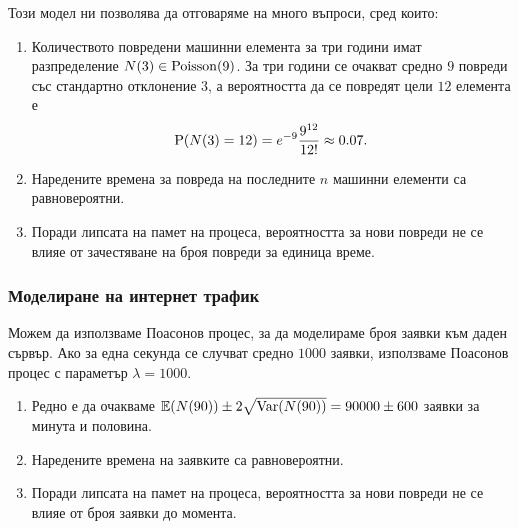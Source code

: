 \documentclass[numbers=endperiod, DIV=15, bibliography=totocnumbered]{scrartcl}
\begin{document}
Този модел ни позволява да отговаряме на много въпроси, сред които:
\begin{enumerate}
  \item Количеството повредени машинни елемента за три години имат разпределение $N(3) \in \operatorname{Poisson}(9)$. За три години се очакват средно $9$ повреди със стандартно отклонение $3$, а вероятността да се повредят цели $12$ елемента е
  \begin{displaymath}
    \operatorname{P}(N(3) = 12) = e^{-9} \frac {9^{12}} {12!} \approx 0.07.
  \end{displaymath}

  \item Наредените времена за повреда на последните $n$ машинни елементи са равновероятни.
  \item Поради липсата на памет на процеса, вероятността за нови повреди не се влияе от зачестяване на броя повреди за единица време.
\end{enumerate}

\subsubsection{Моделиране на интернет трафик}

Можем да използваме Поасонов процес, за да моделираме броя заявки към даден сървър. Ако за една секунда се случват средно $1000$ заявки, използваме Поасонов процес с параметър $\lambda = 1000$.
\begin{enumerate}
  \item Редно е да очакваме $\mathbb{E}(N(90)) \pm 2\sqrt{\operatorname{Var}(N(90))} = 90000 \pm 600$ заявки за минута и половина.
  \item Наредените времена на заявките са равновероятни.
  \item Поради липсата на памет на процеса, вероятността за нови повреди не се влияе от броя заявки до момента.
\end{enumerate}

\printbibliography
\end{document}

